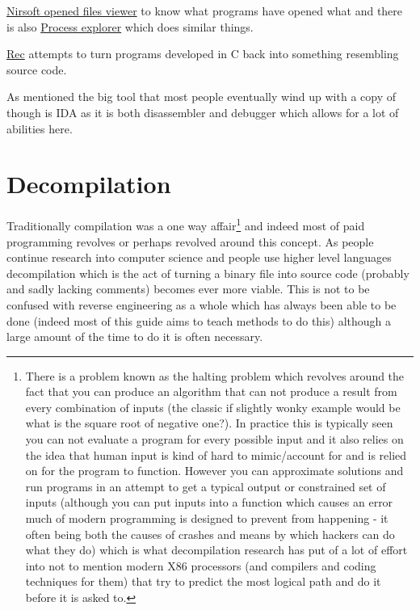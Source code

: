 \documentclass[
]{book}
\begin{document}
\href{http://www.nirsoft.net/utils/opened_files_view.html}{Nirsoft opened files viewer} to know what programs have opened what and there is also \href{http://technet.microsoft.com/en-us/sysinternals/bb896653}{Process explorer} which does similar things.

\href{http://www.backerstreet.com/rec/rec.htm}{Rec} attempts to turn programs developed in C back into something resembling source code.

As mentioned the big tool that most people eventually wind up with a copy of though is IDA as it is both disassembler and debugger which allows for a lot of abilities here.

\hypertarget{decompilation}{%
\section{Decompilation}\label{decompilation}}

Traditionally compilation was a one way affair\footnote{There is a problem known as the halting problem which revolves around the fact that you can produce an algorithm that can not produce a result from every combination of inputs (the classic if slightly wonky example would be what is the square root of negative one?). In practice this is typically seen you can not evaluate a program for every possible input and it also relies on the idea that human input is kind of hard to mimic/account for and is relied on for the program to function. However you can approximate solutions and run programs in an attempt to get a typical output or constrained set of inputs (although you can put inputs into a function which causes an error much of modern programming is designed to prevent from happening - it often being both the causes of crashes and means by which hackers can do what they do) which is what decompilation research has put of a lot of effort into not to mention modern X86 processors (and compilers and coding techniques for them) that try to predict the most logical path and do it before it is asked to.} and indeed most of paid programming revolves or perhaps revolved around this concept. As people continue research into computer science and people use higher level languages decompilation which is the act of turning a binary file into source code (probably and sadly lacking comments) becomes ever more viable. This is not to be confused with reverse engineering as a whole which has always been able to be done (indeed most of this guide aims to teach methods to do this) although a large amount of the time to do it is often necessary.
\end{document}
